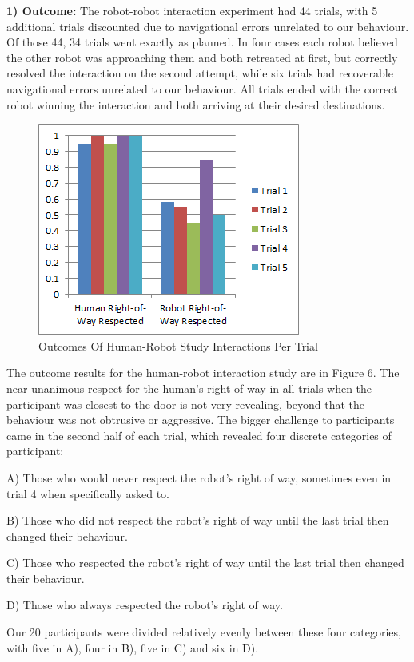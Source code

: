\documentclass[letterpaper, 10 pt, conference]{ieeeconf}  %
\begin{document}
\textbf{1) Outcome:} The robot-robot interaction experiment had 44 trials, with 5 additional trials discounted due to navigational errors unrelated to our behaviour. Of those 44, 34 trials went exactly as planned.  In four cases each robot believed the other robot was approaching them and both retreated at first, but correctly resolved the interaction on the second attempt, while six trials had recoverable navigational errors unrelated to our behaviour. All trials ended with the correct robot winning the interaction and both arriving at their desired destinations.

     \begin{figure}
      \centering
      \includegraphics{outcomes.png}
      \caption{Outcomes Of Human-Robot Study Interactions Per Trial}
      \label{fig:Outcomes}
   \end{figure}

The outcome results for the human-robot interaction study are in Figure 6. The near-unanimous respect for the human's right-of-way in all trials when the participant was closest to the door is not very revealing, beyond that the behaviour was not obtrusive or aggressive. The bigger challenge to participants came in the second half of each trial, which revealed four discrete categories of participant: 

A) Those who would never respect the robot's right of way, sometimes even in trial 4 when specifically asked to. 

B) Those who did not respect the robot's right of way until the last trial then changed their behaviour. 

C) Those who respected the robot's right of way until the last trial then changed their behaviour. 

D) Those who always respected the robot's right of way. 

Our 20 participants were divided relatively evenly between these four categories, with five in A), four in B), five in C) and six in D).
 
\end{document}
